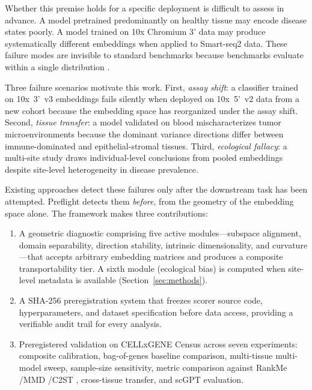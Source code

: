 \documentclass[11pt,letterpaper]{article}
\begin{document}
Whether this premise holds for a specific deployment is difficult to assess in advance. A model pretrained predominantly on healthy tissue may encode disease states poorly. A model trained on 10x Chromium 3' data may produce systematically different embeddings when applied to Smart-seq2 data. These failure modes are invisible to standard benchmarks because benchmarks evaluate within a single distribution \citep{luecken2022scib}.

Three failure scenarios motivate this work. First, \emph{assay shift}: a classifier trained on 10x~3'~v3 embeddings fails silently when deployed on 10x~5'~v2 data from a new cohort because the embedding space has reorganized under the assay shift. Second, \emph{tissue transfer}: a model validated on blood mischaracterizes tumor microenvironments because the dominant variance directions differ between immune-dominated and epithelial-stromal tissues. Third, \emph{ecological fallacy}: a multi-site study draws individual-level conclusions from pooled embeddings despite site-level heterogeneity in disease prevalence.

Existing approaches detect these failures only after the downstream task has been attempted. Preflight detects them \emph{before}, from the geometry of the embedding space alone. The framework makes three contributions:

\begin{enumerate}[nosep]
\item A geometric diagnostic comprising five active modules---subspace alignment, domain separability, direction stability, intrinsic dimensionality, and curvature---that accepts arbitrary embedding matrices and produces a composite transportability tier. A sixth module (ecological bias) is computed when site-level metadata is available (Section~\ref{sec:methods}).

\item A SHA-256 preregistration system that freezes scorer source code, hyperparameters, and dataset specification before data access, providing a verifiable audit trail for every analysis.

\item Preregistered validation on CELLxGENE Census \citep{abdulla2025cellxgene} across seven experiments: composite calibration, bag-of-genes baseline comparison, multi-tissue multi-model sweep, sample-size sensitivity, metric comparison against RankMe \citep{garrido2023rankme}/MMD \citep{gretton2012mmd}/C2ST \citep{lopezpaz2017c2st}, cross-tissue transfer, and scGPT evaluation.
\end{enumerate}
\end{document}
